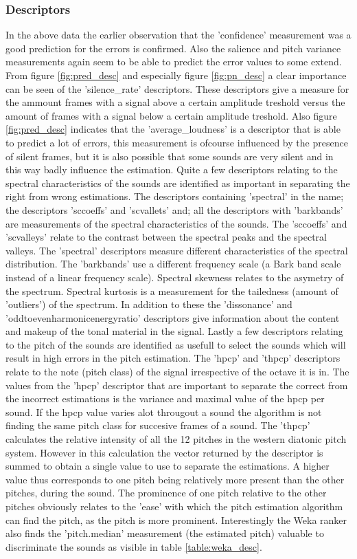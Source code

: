 \documentclass{article}
\begin{document}
\subsubsection{Descriptors}
In the above data the earlier observation that the 'confidence' measurement was a good prediction for the errors is confirmed. Also the salience and pitch variance measurements again seem to be able to predict the error values to some extend. 
From figure \ref{fig:pred_desc} and especially figure \ref{fig:pn_desc} a clear importance can be seen of the 'silence\_rate' descriptors. These descriptors give a measure for the ammount frames with a signal above a certain amplitude treshold versus the amount of frames with a signal below a certain amplitude treshold. Also figure \ref{fig:pred_desc} indicates that the 'average\_loudness' is a descriptor that is able to predict a lot of errors, this measurement is ofcourse influenced by the presence of silent frames, but it is also possible that some sounds are very silent and in this way badly influence the estimation.
Quite a few descriptors relating to the spectral characteristics of the sounds are identified as important in separating the right from wrong estimations. The descriptors containing 'spectral' in the name; the descriptors 'sccoeffs' and 'scvallets' and; all the descriptors with 'barkbands' are measurements of the spectral characteristics of the sounds. The 'sccoeffs' and 'scvalleys' relate to the contrast between the spectral peaks and the spectral valleys. The 'spectral' descriptors measure different characteristics of the spectral distribution. The 'barkbands' use a different frequency scale (a Bark band scale instead of a linear frequency scale). Spectral skewness relates to the asymetry of the spectrum. Spectral kurtosis is a measurement for the tailedness (amount of 'outliers') of the spectrum. In addition to these the 'dissonance' and 'oddtoevenharmonicenergyratio' descriptors give information about the content and makeup of the tonal material in the signal. 
Lastly a few descriptors relating to the pitch of the sounds are identified as usefull to select the sounds which will result in high errors in the pitch estimation. The 'hpcp' and 'thpcp' descriptors relate to the note (pitch class) of the signal irrespective of the octave it is in. The values from the 'hpcp' descriptor that are important to separate the correct from the incorrect estimations is the variance and maximal value of the hpcp per sound. If the hpcp value varies alot througout a sound the algorithm is not finding the same pitch class for succesive frames of a sound. The 'thpcp' calculates the relative intensity of all the 12 pitches in the western diatonic pitch system. However in this calculation the vector returned by the descriptor is summed to obtain a single value to use to separate the estimations. A higher value thus corresponds to one pitch being relatively more present than the other pitches, during the sound. The prominence of one pitch relative to the other pitches obviously relates to the 'ease' with which the pitch estimation algorithm can find the pitch, as the pitch is more prominent. Interestingly the Weka ranker also finds the 'pitch.median' measurement (the estimated pitch) valuable to discriminate the sounds as visible in table \ref{table:weka_desc}.
\end{document}
